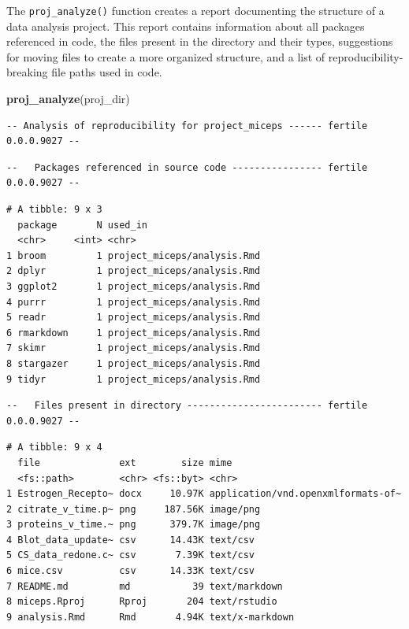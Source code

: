 \documentclass[12pt,twoside]{reedthesis}
\newenvironment{Shaded}{\begin{snugshade}}{\end{snugshade}}
\newcommand{\KeywordTok}[1]{\textcolor[rgb]{0.13,0.29,0.53}{\textbf{#1}}}
\newcommand{\NormalTok}[1]{#1}
\begin{document}
The \texttt{proj\_analyze()} function creates a report documenting the
structure of a data analysis project. This report contains information
about all packages referenced in code, the files present in the
directory and their types, suggestions for moving files to create a more
organized structure, and a list of reproducibility-breaking file paths
used in code.
\begin{Shaded}
\begin{Highlighting}[]
\KeywordTok{proj_analyze}\NormalTok{(proj_dir)}
\end{Highlighting}
\end{Shaded}
\begin{verbatim}
-- Analysis of reproducibility for project_miceps ------ fertile 0.0.0.9027 --
\end{verbatim}
\begin{verbatim}
--   Packages referenced in source code ---------------- fertile 0.0.0.9027 --
\end{verbatim}
\begin{verbatim}
# A tibble: 9 x 3
  package       N used_in                    
  <chr>     <int> <chr>                      
1 broom         1 project_miceps/analysis.Rmd
2 dplyr         1 project_miceps/analysis.Rmd
3 ggplot2       1 project_miceps/analysis.Rmd
4 purrr         1 project_miceps/analysis.Rmd
5 readr         1 project_miceps/analysis.Rmd
6 rmarkdown     1 project_miceps/analysis.Rmd
7 skimr         1 project_miceps/analysis.Rmd
8 stargazer     1 project_miceps/analysis.Rmd
9 tidyr         1 project_miceps/analysis.Rmd
\end{verbatim}
\begin{verbatim}
--   Files present in directory ------------------------ fertile 0.0.0.9027 --
\end{verbatim}
\begin{verbatim}
# A tibble: 9 x 4
  file              ext        size mime                              
  <fs::path>        <chr> <fs::byt> <chr>                             
1 Estrogen_Recepto~ docx     10.97K application/vnd.openxmlformats-of~
2 citrate_v_time.p~ png     187.56K image/png                         
3 proteins_v_time.~ png      379.7K image/png                         
4 Blot_data_update~ csv      14.43K text/csv                          
5 CS_data_redone.c~ csv       7.39K text/csv                          
6 mice.csv          csv      14.33K text/csv                          
7 README.md         md           39 text/markdown                     
8 miceps.Rproj      Rproj       204 text/rstudio                      
9 analysis.Rmd      Rmd       4.94K text/x-markdown                   
\end{verbatim}
\end{document}
